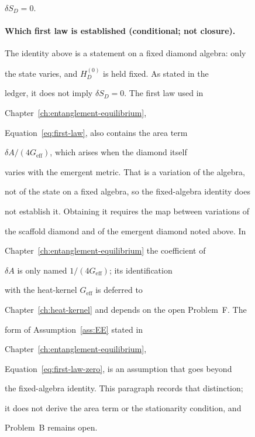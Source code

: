 \(\delta S_D=0\).





\paragraph{Which first law is established (conditional; not closure).} \label{detail:sec-B-paragraphwhichfirstlawisestabl-2}

The identity above is a statement on a fixed diamond algebra: only

the state varies, and \(H_D^{(0)}\) is held fixed.  As stated in the

ledger, it does not imply \(\delta S_D=0\).  The first law used in

Chapter~\ref{ch:entanglement-equilibrium},

Equation~\eqref{eq:first-law}, also contains the area term

\(\delta A/(4G_{\mathrm{eff}})\), which arises when the diamond itself

varies with the emergent metric.  That is a variation of the algebra,

not of the state on a fixed algebra, so the fixed-algebra identity does

not establish it.  Obtaining it requires the map between variations of

the scaffold diamond and of the emergent diamond noted above.  In

Chapter~\ref{ch:entanglement-equilibrium} the coefficient of

\(\delta A\) is only named \(1/(4G_{\mathrm{eff}})\); its identification

with the heat-kernel \(G_{\mathrm{eff}}\) is deferred to

Chapter~\ref{ch:heat-kernel} and depends on the open Problem~F.  The

form of Assumption~\ref{ass:EE} stated in

Chapter~\ref{ch:entanglement-equilibrium},

Equation~\eqref{eq:first-law-zero}, is an assumption that goes beyond

the fixed-algebra identity.  This paragraph records that distinction;

it does not derive the area term or the stationarity condition, and

Problem~B remains open.





